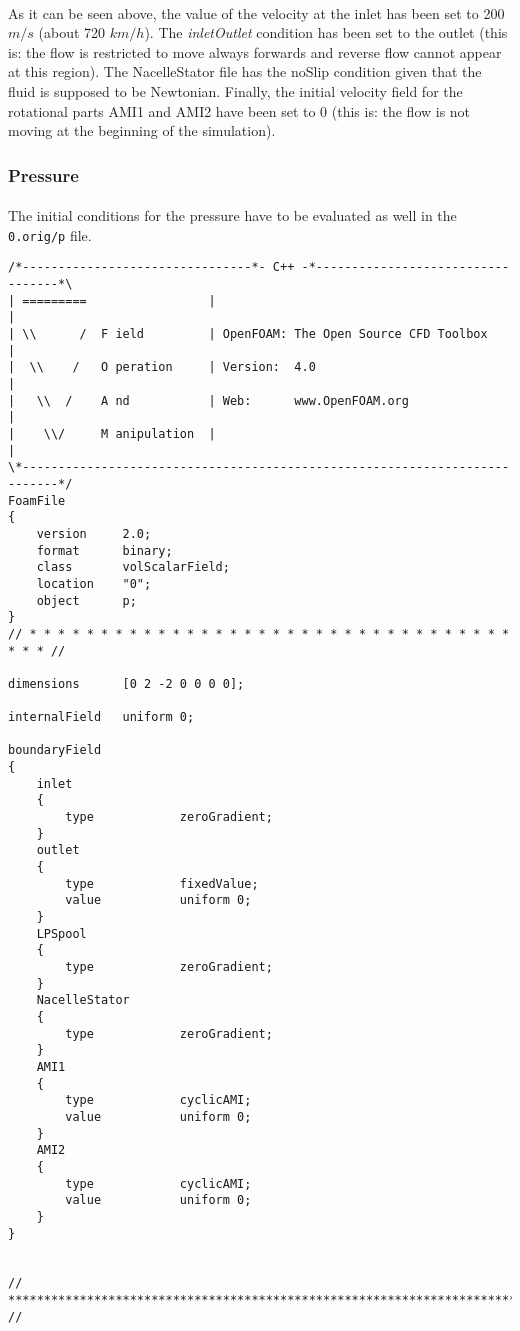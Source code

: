 \paragraph{}As it can be seen above, the value of the velocity at the inlet has been set to 200 $m/s$ (about 720 $km/h$). The \textit{inletOutlet} condition has been set to the outlet (this is: the flow is restricted to move always forwards and reverse flow cannot appear at this region). The NacelleStator file has the noSlip condition given that the fluid is supposed to be Newtonian. Finally, the initial velocity field for the rotational parts AMI1 and AMI2 have been set to 0 (this is: the flow is not moving at the beginning of the simulation).

\subsubsection{Pressure}

\paragraph{}The initial conditions for the pressure have to be evaluated as well in the \texttt{0.orig/p} file.

\begin{footnotesize}
\begin{verbatim}
/*--------------------------------*- C++ -*----------------------------------*\
| =========                 |                                                 |
| \\      /  F ield         | OpenFOAM: The Open Source CFD Toolbox           |
|  \\    /   O peration     | Version:  4.0                                   |
|   \\  /    A nd           | Web:      www.OpenFOAM.org                      |
|    \\/     M anipulation  |                                                 |
\*---------------------------------------------------------------------------*/
FoamFile
{
    version     2.0;
    format      binary;
    class       volScalarField;
    location    "0";
    object      p;
}
// * * * * * * * * * * * * * * * * * * * * * * * * * * * * * * * * * * * * * //

dimensions      [0 2 -2 0 0 0 0];

internalField   uniform 0;

boundaryField
{
    inlet
    {
        type            zeroGradient;
    }
    outlet
    {
        type            fixedValue;
        value           uniform 0;
    }
    LPSpool
    {
        type            zeroGradient;
    }
    NacelleStator
    {
        type            zeroGradient;
    }
    AMI1
    {
        type            cyclicAMI;
        value           uniform 0;
    }
    AMI2
    {
        type            cyclicAMI;
        value           uniform 0;
    }
}


// ************************************************************************* //
\end{verbatim}
\end{footnotesize}

